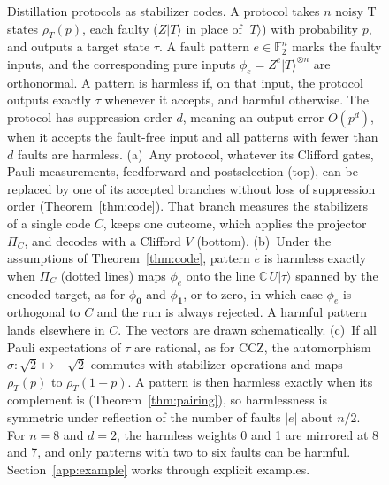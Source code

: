 \documentclass[aps,prl,reprint,twocolumn,amsmath,amssymb,floatfix,nofootinbib,superscriptaddress]{revtex4-2}
\newcommand{\F}{\mathbb F_2}
\begin{document}
\begin{figure}[t]
\centering

\caption{Distillation protocols as stabilizer codes. A protocol takes $n$ noisy T states $\rho_T(p)$, each faulty ($Z|T\rangle$ in place of $|T\rangle$) with probability $p$, and outputs a target state $\tau$. A fault pattern $e\in\F^n$ marks the faulty inputs, and the corresponding pure inputs $\phi_e=Z^e|T\rangle^{\otimes n}$ are orthonormal. A pattern is harmless if, on that input, the protocol outputs exactly $\tau$ whenever it accepts, and harmful otherwise. The protocol has suppression order $d$, meaning an output error $O(p^d)$, when it accepts the fault-free input and all patterns with fewer than $d$ faults are harmless. (a)~Any protocol, whatever its Clifford gates, Pauli measurements, feedforward and postselection (top), can be replaced by one of its accepted branches without loss of suppression order (Theorem~\ref{thm:code}). That branch measures the stabilizers of a single code $C$, keeps one outcome, which applies the projector $\Pi_C$, and decodes with a Clifford $V$ (bottom). (b)~Under the assumptions of Theorem~\ref{thm:code}, pattern $e$ is harmless exactly when $\Pi_C$ (dotted lines) maps $\phi_e$ onto the line $\mathbb C\,U|\tau\rangle$ spanned by the encoded target, as for $\phi_{\mathbf0}$ and $\phi_{\mathbf1}$, or to zero, in which case $\phi_e$ is orthogonal to $C$ and the run is always rejected. A harmful pattern lands elsewhere in $C$. The vectors are drawn schematically. (c)~If all Pauli expectations of $\tau$ are rational, as for CCZ, the automorphism $\sigma\colon\sqrt2\mapsto-\sqrt2$ commutes with stabilizer operations and maps $\rho_T(p)$ to $\rho_T(1-p)$. A pattern is then harmless exactly when its complement is (Theorem~\ref{thm:pairing}), so harmlessness is symmetric under reflection of the number of faults $|e|$ about $n/2$. For $n=8$ and $d=2$, the harmless weights 0 and 1 are mirrored at 8 and 7, and only patterns with two to six faults can be harmful. Section~\ref{app:example} works through explicit examples.}
\label{fig:reductions}
\end{figure}
\end{document}
